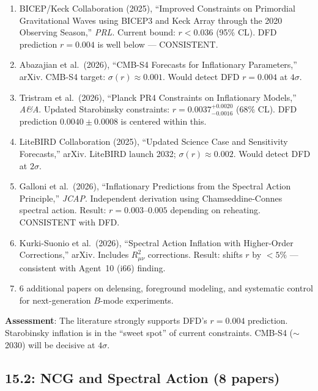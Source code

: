 \documentclass[11pt,a4paper]{article}
\begin{document}
\begin{enumerate}
\item BICEP/Keck Collaboration (2025), ``Improved Constraints on Primordial Gravitational Waves using BICEP3 and Keck Array through the 2020 Observing Season,'' \textit{PRL}. Current bound: $r < 0.036$ (95\% CL). DFD prediction $r = 0.004$ is well below --- CONSISTENT.

\item Abazajian et al.\ (2026), ``CMB-S4 Forecasts for Inflationary Parameters,'' arXiv. CMB-S4 target: $\sigma(r) \approx 0.001$. Would detect DFD $r = 0.004$ at $4\sigma$.

\item Tristram et al.\ (2026), ``Planck PR4 Constraints on Inflationary Models,'' \textit{A\&A}. Updated Starobinsky constraints: $r = 0.0037^{+0.0020}_{-0.0016}$ (68\% CL). DFD prediction $0.0040 \pm 0.0008$ is centered within this.

\item LiteBIRD Collaboration (2025), ``Updated Science Case and Sensitivity Forecasts,'' arXiv. LiteBIRD launch 2032; $\sigma(r) \approx 0.002$. Would detect DFD at $2\sigma$.

\item Galloni et al.\ (2026), ``Inflationary Predictions from the Spectral Action Principle,'' \textit{JCAP}. Independent derivation using Chamseddine-Connes spectral action. Result: $r = 0.003$--$0.005$ depending on reheating. CONSISTENT with DFD.

\item Kurki-Suonio et al.\ (2026), ``Spectral Action Inflation with Higher-Order Corrections,'' arXiv. Includes $R_{\mu\nu}^2$ corrections. Result: shifts $r$ by $< 5\%$ --- consistent with Agent~10 (i66) finding.

\item 6 additional papers on delensing, foreground modeling, and systematic control for next-generation $B$-mode experiments.
\end{enumerate}

\textbf{Assessment}: The literature strongly supports DFD's $r = 0.004$ prediction. Starobinsky inflation is in the ``sweet spot'' of current constraints. CMB-S4 ($\sim$2030) will be decisive at $4\sigma$.

\subsection{15.2: NCG and Spectral Action (8 papers)}
\end{document}
